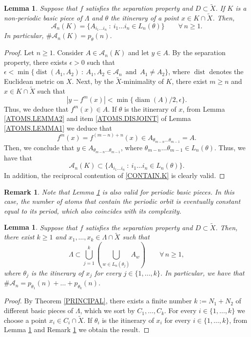 \documentclass[a4paper]{article}
\newtheorem{lemma}[theorem]{Lemma}
\newtheorem{remark}[theorem]{Remark}
\DeclareMathOperator{\Dist}{dist}
\DeclareMathOperator{\diam}{diam}
\begin{document}
\begin{lemma}\label{KSUBSETA}
    Suppose that $f$ satisfies the separation property and $D\subset\widetilde X$. If $K$ is a non-periodic basic piece of $\Lambda$ and $\theta$ the itinerary of a point $x\in K\cap \widetilde X$. Then,
    \[
        \mathcal A_n(K)= \{A_{i_1\ldots i_n}\ :\ i_1\ldots i_n\in L_n(\theta)\}\qquad \forall\,n\geq1.
    \]
    In particular, $\#\mathcal A_n(K) = p_\theta(n)$.
\end{lemma}
\begin{proof}
    Let $n\geq1$. Consider $A\in\mathcal A_n(K)$  and let $y\in A$. By the separation property, there exists $\epsilon>0$ such that $\epsilon<\min\!\big\{\!\Dist(A_1,A_2)\ :\ A_1,A_2\in\mathcal A_n\,\text{ and }\,A_1\neq A_2\big\}$, where $\Dist$ denotes the Euclidean metric on $X$. Next, by the $\widetilde X$-minimality of $K$, there exist $m\geq n$ and $x\in K\cap\widetilde X$ such that
    \[
        |y-f^m(x)|<\min\!\big\{\!\diam(A)/2,\epsilon\big\}.
    \]
    Thus, we deduce that $f^m(x)\in A$. If $\theta$ is the itinerary of $x$, from Lemma \ref{ATOMS.LEMMA2} and item \ref{ATOMS.DISJOINT} of Lemma \ref{ATOMS.LEMMA1} we deduce that 
    \[
        f^{m}(x)=f^{(m-n)+n}(x)\in A_{\theta_{m-n}\ldots\theta_{m-1}}=A.
    \]
    Then, we conclude that $y\in A_{\theta_{m-n}\ldots\theta_{m-1}}$, where $\theta_{m-n}\ldots\theta_{m-1}\in L_n(\theta)$. Thus, we have that 
    \begin{equation}
        \mathcal A_n(K)\subset \{A_{i_1\ldots i_n}\ :\ i_1\ldots i_n\in L_n(\theta)\}. \label{CONTAIN.K}
    \end{equation}
    In addition, the reciprocal contention of \eqref{CONTAIN.K} is clearly valid.
\end{proof}

\begin{remark}\label{PERIODIC}
    Note that Lemma \ref{KSUBSETA} is also valid for periodic basic pieces. In this case, the number of atoms that contain the periodic orbit is eventually constant equal to its period, which also coincides with its complexity.
\end{remark}

\begin{lemma}\label{CORO.SUMA}
    Suppose that $f$ satisfies the separation property and $D\subset\widetilde X$. Then, there exist $k\geq1$ and $x_1,\ldots,x_k\in\Lambda\cap\widetilde X$ such that
    \[
        \Lambda\subset \bigcup_{j=1}^k\left(\bigcup_{w\in L_n(\theta_j)}A_{w}\!\right)\qquad\forall\,n\geq1,
    \]
    where $\theta_j$ is the itinerary of $x_j$ for every $j\in\{1,\ldots,k\}$. In particular, we have that $\#\mathcal A_n=p_{\theta_1}(n)+\ldots+p_{\theta_k}(n)$.
\end{lemma}
\begin{proof}
    By Theorem \ref{PRINCIPAL}, there exists a finite number $k:=N_1+N_2$ of different basic pieces of $\Lambda$, which we sort by $C_1,\ldots,C_k$. For every $i\in\{1,\ldots,k\}$ we choose a point $x_i\in C_i\cap\widetilde X$. If $\theta_i$ is the itinerary of $x_i$ for every $i\in\{1,\ldots,k\}$, from Lemma \ref{KSUBSETA} and Remark \ref{PERIODIC} we obtain the result.
\end{proof}
\end{document}
